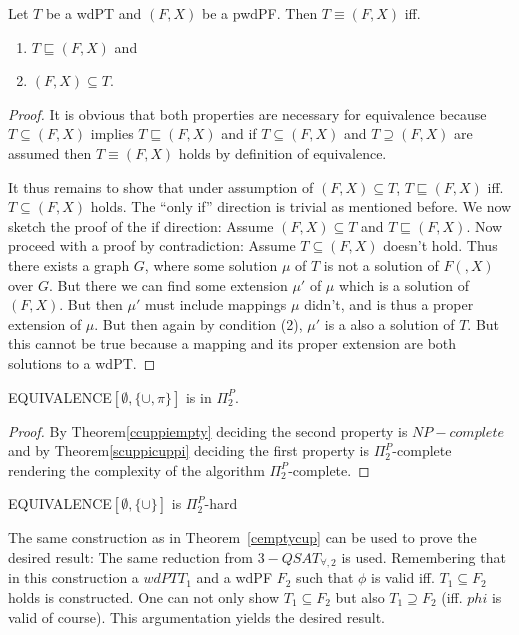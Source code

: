 \begin{theorem}
Let $T$ be a wdPT and $(F,X)$ be a pwdPF.
Then $T \equiv (F,X)$ iff.
\begin{enumerate}
\item $T \sqsubseteq (F,X)$ and
\item $(F,X) \subseteq T$.
\end{enumerate}
\end{theorem}
\begin{proof}
It is obvious that both properties are necessary for equivalence because 
$T \subseteq (F,X)$ implies $T \sqsubseteq (F,X)$ and if  $T \subseteq (F,X)$
and
$T \supseteq (F,X)$ are assumed then $T \equiv (F,X)$ holds by definition of equivalence.

It thus remains to show that  under assumption of 
$(F,X) \subseteq T$, $T \sqsubseteq (F,X)$ iff. $T \subseteq (F,X)$  holds. 
The ``only if'' direction is trivial as mentioned before.
We now sketch the proof of the if direction:
Assume  $(F,X) \subseteq T$ and $T \sqsubseteq (F,X)$.
Now proceed with a proof by contradiction: Assume $T \subseteq (F,X)$ doesn't
hold. Thus there exists a graph $G$, where some solution $\mu$ of $T$ is not a
solution of $F(,X)$ over $G$. But there we can find some extension $\mu'$ of
$\mu$ which is a solution of $(F,X)$. But then $\mu'$ must include mappings
$\mu$ didn't, and is thus a proper extension of $\mu$. But then again by
condition (2), $\mu'$ is a also a solution of $T$. But this cannot be true
because a mapping and its proper extension are both solutions to a wdPT. 
\end{proof}

\begin{theorem}
EQUIVALENCE$[\emptyset,\{\cup,\pi\}]$ is in $\Pi_2^P$.
\end{theorem}
\begin{proof}
By Theorem\ref{ccuppiempty} deciding the second property is $NP-complete$ and
by Theorem\ref{scuppicuppi} deciding the first property is $\Pi_2^P$-complete
rendering the complexity of the algorithm $\Pi_2^P$-complete.
\end{proof}

\begin{theorem}
EQUIVALENCE$[\emptyset,\{\cup\}]$ is $\Pi_2^P$-hard
\end{theorem}
\begin{proofidea}
The same construction as in Theorem~\ref{cemptycup} can be used to prove the
desired result: The same reduction from $3-QSAT_{\forall,2}$ is used.
Remembering that in this construction a $wdPT T_1$ and a wdPF $F_2$ such that
$\phi$ is valid iff.  $T_1 \subseteq F_2$ holds is constructed.
One can
not only show $T_1 \subseteq F_2$ but also $T_1 \supseteq F_2$ (iff. $phi$ is
valid of course). This
argumentation yields the desired result.
\end{proofidea}

